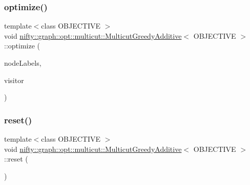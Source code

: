 \subsubsection{\texorpdfstring{optimize()}{optimize()}}
{\footnotesize\ttfamily template$<$class O\+B\+J\+E\+C\+T\+I\+VE $>$ \\
void \hyperlink{classnifty_1_1graph_1_1opt_1_1multicut_1_1MulticutGreedyAdditive}{nifty\+::graph\+::opt\+::multicut\+::\+Multicut\+Greedy\+Additive}$<$ O\+B\+J\+E\+C\+T\+I\+VE $>$\+::optimize (\begin{DoxyParamCaption}\item[{\hyperlink{classnifty_1_1graph_1_1opt_1_1multicut_1_1MulticutGreedyAdditive_a1a4aa1adf2a8d0183df965b535494225}{Node\+Labels\+Type} \&}]{node\+Labels,  }\item[{\hyperlink{classnifty_1_1graph_1_1opt_1_1multicut_1_1MulticutGreedyAdditive_a3ff8100793fd975c52e79cdde194aa93}{Visitor\+Base\+Type} $\ast$}]{visitor }\end{DoxyParamCaption})\hspace{0.3cm}{\ttfamily [virtual]}}

\mbox{\label{classnifty_1_1graph_1_1opt_1_1multicut_1_1MulticutGreedyAdditive_a71bb90e1edfa2900a941002e31160e84}} 
\subsubsection{\texorpdfstring{reset()}{reset()}}
{\footnotesize\ttfamily template$<$class O\+B\+J\+E\+C\+T\+I\+VE $>$ \\
void \hyperlink{classnifty_1_1graph_1_1opt_1_1multicut_1_1MulticutGreedyAdditive}{nifty\+::graph\+::opt\+::multicut\+::\+Multicut\+Greedy\+Additive}$<$ O\+B\+J\+E\+C\+T\+I\+VE $>$\+::reset (\begin{DoxyParamCaption}{ }\end{DoxyParamCaption})}

\mbox{\label{classnifty_1_1graph_1_1opt_1_1multicut_1_1MulticutGreedyAdditive_a1d9cf81f32600a8f52ff4e1607203716}} 
